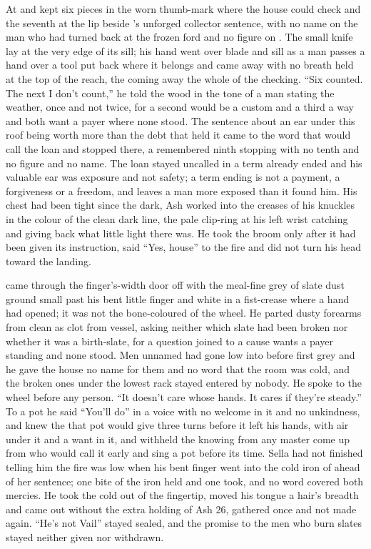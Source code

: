 At  and   kept six pieces in the worn thumb-mark where the house could check and the seventh at the lip beside 's unforged collector sentence, with no name on the man who had turned back at the frozen ford and no figure on . The small knife lay at the very edge of its sill; his hand went over blade and sill as a man passes a hand over a tool put back where it belongs and came away with no breath held at the top of the reach, the coming away the whole of the checking. “Six counted. The next I don't count,” he told the wood in the tone of a man stating the weather, once and not twice, for a second would be a custom and a third a way and both want a payer where none stood. The sentence about an ear under this roof being worth more than the debt that held it came to the word that would call the loan and stopped there, a remembered ninth stopping with no tenth and no figure and no name. The loan stayed uncalled in a term already ended and his valuable ear was exposure and not safety; a term ending is not a payment, a forgiveness or a freedom, and leaves a man more exposed than it found him. His chest had been tight since the dark, Ash worked into the creases of his knuckles in the colour of the clean dark line, the pale clip-ring at his left wrist catching and giving back what little light there was. He took the broom only after it had been given its instruction, said “Yes, house” to the fire and did not turn his head toward the landing.

 came through the finger's-width door off  with the meal-fine grey of slate dust ground small past his bent little finger and white in a fist-crease where a hand had opened; it was not the bone-coloured  of the wheel. He parted dusty forearms from clean as clot from vessel, asking neither which slate had been broken nor whether it was a birth-slate, for a question joined to a cause wants a payer standing and none stood. Men unnamed had gone low into  before first grey and he gave the house no name for them and no word that the room was cold, and the broken ones under the lowest rack stayed entered by nobody. He spoke to the wheel before any person. “It doesn't care whose hands. It cares if they're steady.” To a pot he said “You'll do” in a voice with no welcome in it and no unkindness, and knew the  that pot would give three turns before it left his hands, with air under it and a want in it, and withheld the knowing from any master come up from  who would call it early and sing a pot before its time. Sella had not finished telling him the fire was low when his bent finger went into the cold iron of  ahead of her sentence; one bite of the iron held and one took, and no  word covered both mercies. He took the cold out of the fingertip, moved his tongue a hair's breadth and came out without the extra holding of Ash 26, gathered once and not made again. “He's not Vail” stayed sealed, and the promise to the men who burn slates stayed neither given nor withdrawn.

